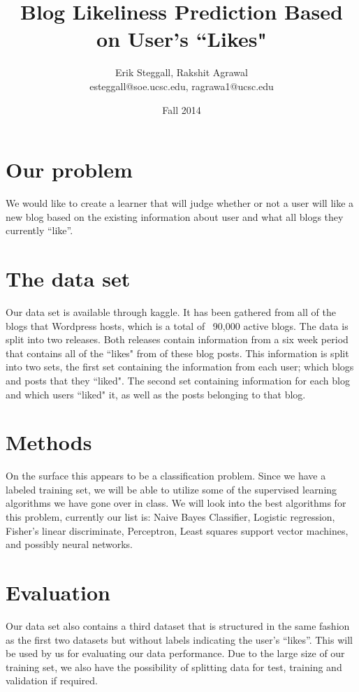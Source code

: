 \documentclass{article}
\title{Blog Likeliness Prediction Based on User's 
``Likes"}
\author{Erik Steggall, Rakshit Agrawal \\ esteggall@soe.ucsc.edu, ragrawa1@ucsc.edu}
\date{Fall 2014}
\begin{document}
 \maketitle \pagestyle{empty}

\section*{Our problem}
We would like to create a learner that will judge whether or not a user will like a new blog based on the existing information about user and what all blogs they currently ``like''. 
\section*{The data set}
Our data set is available through kaggle. It has been gathered from all of the blogs that Wordpress hosts, which is a total of ~90,000 active blogs. The data is split into two releases. Both releases contain information from a six week period that contains all of the ``likes" from of these blog posts. This information is split into two sets, the first set containing the information from each user; which blogs and posts that they ``liked". The second set containing information for each blog and which users ``liked" it, as well as the posts belonging to that blog.\\

\section*{Methods}
On the surface this appears to be a classification problem. Since we have a labeled training set, we will be able to utilize some of the supervised learning algorithms we have gone over in class. We will look into the best algorithms for this problem, currently our list is: Naive Bayes Classifier, Logistic regression, Fisher's linear discriminate, Perceptron, Least squares support vector machines, and possibly neural networks.\\

\section*{Evaluation}
Our data set also contains a third dataset that is structured in the same fashion as the first two datasets but without labels indicating the user's  ``likes''. This will be used by us for evaluating our data performance. Due to the large size of our training set, we also have the possibility of splitting data for test, training and validation if required. \\
\end{document}
